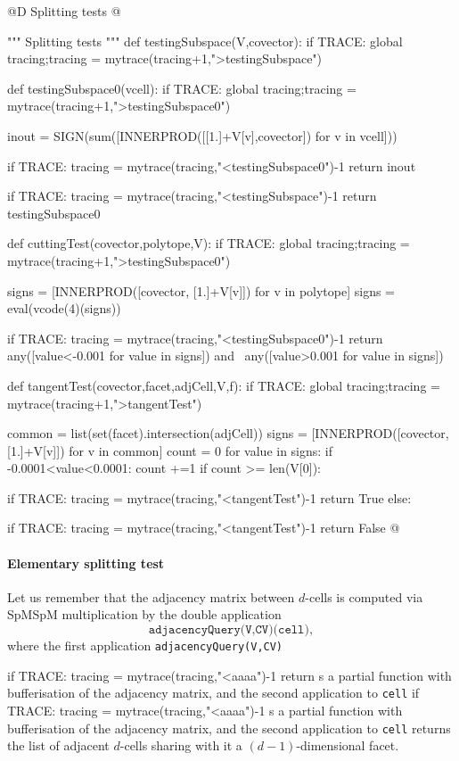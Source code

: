 \documentclass[11pt,oneside]{article}	%
\begin{document}
@D Splitting tests
@{""" Splitting tests """
def testingSubspace(V,covector):
	if TRACE: global tracing;tracing = mytrace(tracing+1,">testingSubspace")

	def testingSubspace0(vcell):
		if TRACE: global tracing;tracing = mytrace(tracing+1,">testingSubspace0")

		inout = SIGN(sum([INNERPROD([[1.]+V[v],covector]) for v in vcell]))

		if TRACE: tracing = mytrace(tracing,"<testingSubspace0")-1
		return inout

	if TRACE: tracing = mytrace(tracing,"<testingSubspace")-1
	return testingSubspace0
	
def cuttingTest(covector,polytope,V):
	if TRACE: global tracing;tracing = mytrace(tracing+1,">testingSubspace0")

	signs = [INNERPROD([covector, [1.]+V[v]]) for v in polytope]
	signs = eval(vcode(4)(signs))

	if TRACE: tracing = mytrace(tracing,"<testingSubspace0")-1
	return any([value<-0.001 for value in signs]) and \
			any([value>0.001 for value in signs])
	
def tangentTest(covector,facet,adjCell,V,f):
	if TRACE: global tracing;tracing = mytrace(tracing+1,">tangentTest")

	common = list(set(facet).intersection(adjCell))
	signs = [INNERPROD([covector, [1.]+V[v]]) for v in common]
	count = 0
	for value in signs:
		if -0.0001<value<0.0001: count +=1
	if count >= len(V[0]): 

		if TRACE: tracing = mytrace(tracing,"<tangentTest")-1
		return True
	else: 

		if TRACE: tracing = mytrace(tracing,"<tangentTest")-1
		return False	
@}




\paragraph{Elementary splitting test}

Let us remember that the adjacency matrix between $d$-cells is computed via SpMSpM multiplication by the double application 
\[
\texttt{adjacencyQuery(V,CV)(cell)}, 
\] 
where the first application \texttt{adjacencyQuery(V,CV)}

if TRACE: tracing = mytrace(tracing,"<aaaa")-1
return
s a partial function with bufferisation of the adjacency matrix, and the second application to \texttt{cell} if TRACE: tracing = mytrace(tracing,"<aaaa")-1
s a partial function with bufferisation of the adjacency matrix, and the second application to \texttt{cell} returns the list of adjacent $d$-cells sharing with it a $(d-1)$-dimensional facet.
\end{document}
